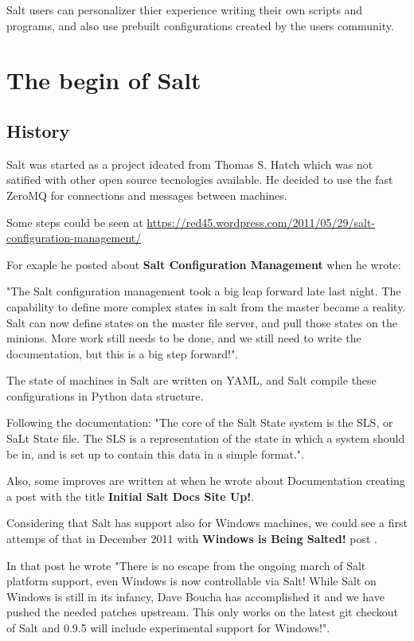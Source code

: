 \documentclass[12pt,a4paper,openright,twoside]{book}
\begin{document}
Salt users can personalizer thier experience writing their own scripts and programs, and also use prebuilt configurations created by the users community.

\section{The begin of Salt}

\subsection{History}
Salt was started as a project ideated from Thomas S. Hatch which was not satified with other open source tecnologies available\cite{saltFloss}. He decided to use the fast ZeroMQ for connections and messages between machines.

Some steps could be seen at \url{https://red45.wordpress.com/2011/05/29/salt-configuration-management/}


For exaple he posted about \textbf{Salt Configuration Management} when he wrote:


"The Salt configuration management took a big leap forward late last night. The capability to define more complex states in salt from the master became a reality. Salt can now define states on the master file server, and pull those states on the minions. More work still needs to be done, and we still need to write the documentation, but this is a big step forward!".


The state of machines in Salt are written on YAML, and Salt compile these configurations in Python data structure.


Following the documentation: "The core of the Salt State system is the SLS, or SaLt State file. The SLS is a representation of the state in which a system should be in, and is set up to contain this data in a simple format."\cite{saltDocSLS}.

Also, some improves are written at when he wrote about Documentation creating a post with the title \textbf{Initial Salt Docs Site Up!}.\cite{saltPost}


Considering that Salt has support also for Windows machines, we could see a first attemps of that in December 2011 with \textbf{Windows is Being Salted!} post \cite{saltPost2}.


In that post he wrote "There is no escape from the ongoing march of Salt platform support, even Windows is now controllable via Salt! While Salt on Windows is still in its infancy, Dave Boucha has accomplished it and we have pushed the needed patches upstream. This only works on the latest git checkout of Salt and 0.9.5 will include experimental support for Windows!"\cite{saltPost2}.
\end{document}
